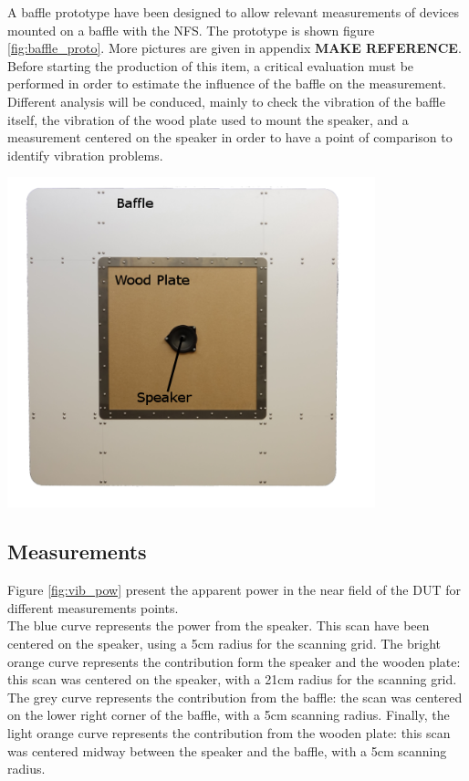 \documentclass{report}
\begin{document}
\begin{minipage}{0.6\textwidth}
A baffle prototype have been designed to allow relevant measurements of devices mounted on a baffle with the NFS. The prototype is shown figure \ref{fig:baffle_proto}. More pictures are given in appendix \textbf{MAKE REFERENCE}. \\

Before starting the production of this item, a critical evaluation must be performed in order to estimate the influence of the baffle on the measurement. Different analysis will be conduced, mainly to check the vibration of the baffle itself, the vibration of the wood plate used to mount the speaker, and a measurement centered on the speaker in order to have a point of comparison to identify vibration problems.
\end{minipage}
\begin{minipage}{0.4\textwidth}
\begin{center}
	\includegraphics[width=0.8\textwidth]{GridOpti/Baffle_Alone_2} 
    \captionsetup{hypcap=false} 
	\label{fig:baffle_proto}
\end{center}
\end{minipage} 

\subsection{Measurements}

Figure \ref{fig:vib_pow} present the apparent power in the near field of the DUT for different measurements points. \\
The blue curve represents the power from the speaker. This scan have been centered on the speaker, using a 5cm radius for the scanning grid. The bright orange curve represents the contribution form the speaker and the wooden plate: this scan was centered on the speaker, with a 21cm radius for the scanning grid. The grey curve represents the contribution from the baffle: the scan was centered on the lower right corner of the baffle, with a 5cm scanning radius. Finally, the light orange curve represents the contribution from the wooden plate: this scan was centered midway between the speaker and the baffle, with a 5cm scanning radius. \\
\end{document}
